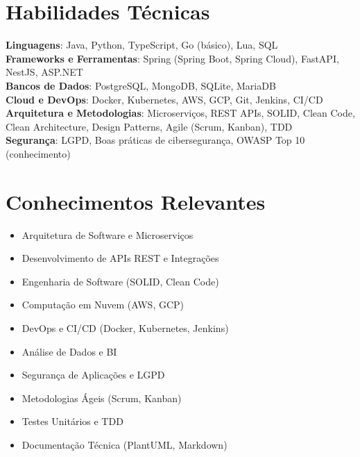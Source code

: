 \documentclass[letterpaper,11pt]{article}
\begin{document}
\section{Habilidades Técnicas}
 \begin{itemize}[leftmargin=0.15in, label={}]
    \small{\item{
     \textbf{Linguagens}{: Java, Python, TypeScript, Go (básico), Lua, SQL} \\
     \textbf{Frameworks e Ferramentas}{: Spring (Spring Boot, Spring Cloud), FastAPI, NestJS, ASP.NET} \\
     \textbf{Bancos de Dados}{: PostgreSQL, MongoDB, SQLite, MariaDB} \\
     \textbf{Cloud e DevOps}{: Docker, Kubernetes, AWS, GCP, Git, Jenkins, CI/CD} \\
     \textbf{Arquitetura e Metodologias}{: Microserviços, REST APIs, SOLID, Clean Code, Clean Architecture, Design Patterns, Agile (Scrum, Kanban), TDD} \\
     \textbf{Segurança}{: LGPD, Boas práticas de cibersegurança, OWASP Top 10 (conhecimento)} \\
    }}
 \end{itemize}

\section{Conhecimentos Relevantes}
    \begin{multicols}{2}
        \begin{itemize}[itemsep=-5pt, parsep=3pt]
            \item Arquitetura de Software e Microserviços
            \item Desenvolvimento de APIs REST e Integrações
            \item Engenharia de Software (SOLID, Clean Code)
            \item Computação em Nuvem (AWS, GCP)
            \item DevOps e CI/CD (Docker, Kubernetes, Jenkins)
            \item Análise de Dados e BI
            \item Segurança de Aplicações e LGPD
            \item Metodologias Ágeis (Scrum, Kanban)
            \item Testes Unitários e TDD
            \item Documentação Técnica (PlantUML, Markdown)
        \end{itemize}
    \end{multicols}
\end{document}
